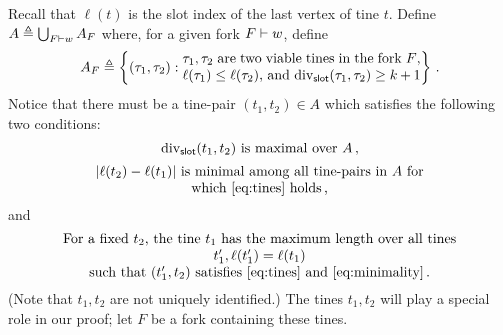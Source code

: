   Recall that $\ell(t)$ is the slot index of the last vertex of tine
  $t$.  
  Define $A \triangleq \bigcup_{F \vdash w} A_F$ where, for a
  given fork $F \vdash w$, define
  \[
    A_F \triangleq \left\{
      (\tau_1, \tau_2) \SuchThat \parbox{60mm}{       
      $\tau_1, \tau_2$ are two viable tines in the fork $F$, 
      $\ell(\tau_1) \leq \ell(\tau_2)$, and 
      $\SlotDivergence(\tau_1, \tau_2) \geq k + 1$
      }
     \right\}
     \,.
  \]
  Notice that there must be a tine-pair $(t_1, t_2) \in A$ which satisfies the following two conditions: 
    \begin{equation}\label{eq:tines}
      \mathrm{div}_{\mathsf{slot}}(t_1, t_2) 
      \text{ is maximal over $A$\,,}
    \end{equation}
  \begin{equation}\label{eq:minimality}
    \parbox{0.85\columnwidth}{\centering
    $| \ell(t_2) - \ell(t_1) |$ 
      is minimal among all tine-pairs in $A$ 
      for which~\eqref{eq:tines} holds\,, 
      }
  \end{equation}
  and
  \begin{equation}\label{eq:length-multihonest}
    \parbox{0.85 \columnwidth}{\centering
    For a fixed $t_2$, 
    the tine $t_1$ has the maximum length 
    over all tines $t_1', \ell(t_1') = \ell(t_1)$ \\
    such that $(t_1', t_2)$ 
    satisfies~\eqref{eq:tines} and~\eqref{eq:minimality}\,. 
    }
  \end{equation}
  (Note that $t_1, t_2$ are not uniquely identified.)
  The tines $t_1, t_2$ will play a special role in our proof; 
  let $F$ be a fork containing these tines. 

